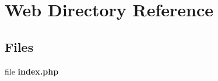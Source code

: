 \section{Web Directory Reference}
\label{dir_8069eed1070612d812aa4ab345356666}
\subsection*{Files}
\begin{DoxyCompactItemize}
\item 
file \textbf{ index.\+php}
\end{DoxyCompactItemize}
